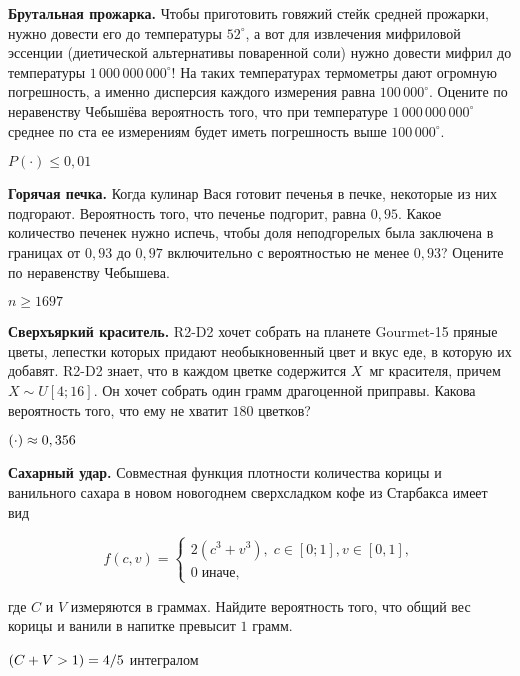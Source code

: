 \documentclass[12pt, addpoints]{exam} %
\let\P\relax
\DeclareMathOperator{\P}{\mathbb{P}}
\renewcommand{\le}{\leqslant}
\renewcommand{\ge}{\geqslant}
\begin{document}
\begin{questions}

\question \textbf{Брутальная прожарка.} Чтобы приготовить говяжий стейк средней прожарки, нужно довести его до температуры $52^\circ$, а вот для извлечения мифриловой эссенции (диетической альтернативы поваренной соли) нужно довести мифрил до температуры $1\,000\,000\,000^\circ$! На таких температурах термометры дают огромную погрешность, а именно дисперсия каждого измерения равна $100\,000^\circ$. Оцените по неравенству Чебышёва вероятность того, что при температуре $1\,000\,000\,000^\circ$ среднее по ста ее измерениям будет иметь погрешность выше $100\,000^\circ$.
\begin{solution}
$P(\cdot)\le 0,01$
\end{solution}

\question \textbf{Горячая печка.} Когда кулинар Вася готовит печенья в печке, некоторые из них подгорают. Вероятность того, что печенье подгорит, равна $0,95$. Какое количество печенек нужно испечь, чтобы доля неподгорелых была заключена в границах от $0,93$ до $0,97$ включительно с вероятностью не менее $0,93$? Оцените по неравенству Чебышева.
\begin{solution}
$n \ge 1697$
\end{solution}

\question \textbf{Сверхъяркий краситель.} R2-D2 хочет собрать на планете Gourmet-15 пряные цветы, лепестки которых придают необыкновенный цвет и вкус еде, в которую их добавят. R2-D2 знает, что в каждом цветке содержится $X$~мг красителя, причем $X\sim U[4; 16]$. Он хочет собрать один грамм драгоценной приправы. Какова вероятность того, что ему не хватит $180$ цветков?
\begin{solution}
$\P(\cdot) \approx 0,356$
\end{solution}

\question \textbf{Сахарный удар.} Совместная функция плотности количества корицы и ванильного сахара в новом новогоднем сверхсладком кофе из Старбакса имеет вид

      \[
		f(c,v)=\begin{cases}
		2(c^3 + v^3), \; c \in [0;1], v \in [0,1], \\
		0\; \text{иначе},
		\end{cases}
		\]

где $C$ и $V$  измеряются в граммах. Найдите вероятность того, что общий вес корицы и ванили в напитке превысит $1$ грамм.

\begin{solution}
$\P (C + V > 1) = 4/5 $ интегралом
\end{solution}


\end{questions}
\end{document}
